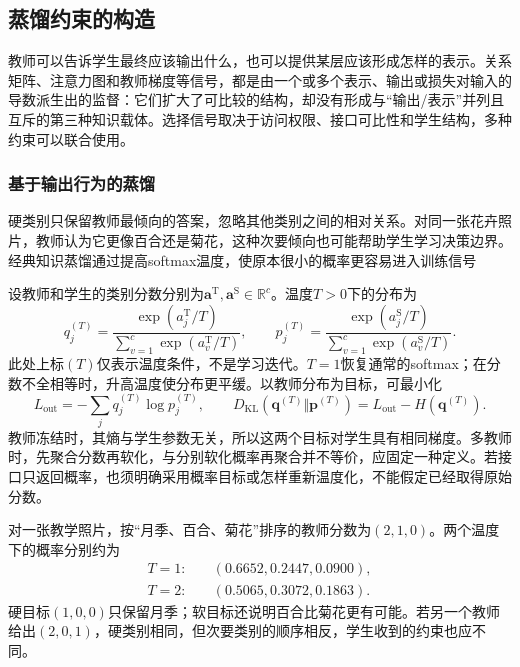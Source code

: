 \subsection{蒸馏约束的构造}
\label{sec:ket-integration-distillation-losses}

教师可以告诉学生最终应该输出什么，也可以提供某层应该形成怎样的表示。关系矩阵、注意力图和教师梯度等信号，都是由一个或多个表示、输出或损失对输入的导数派生出的监督：它们扩大了可比较的结构，却没有形成与“输出/表示”并列且互斥的第三种知识载体。选择信号取决于访问权限、接口可比性和学生结构，多种约束可以联合使用。

\subsubsection{基于输出行为的蒸馏}
\label{sec:ket-integration-output-distillation}

硬类别只保留教师最倾向的答案，忽略其他类别之间的相对关系。对同一张花卉照片，教师认为它更像百合还是菊花，这种次要倾向也可能帮助学生学习决策边界。经典知识蒸馏通过提高softmax温度，使原本很小的概率更容易进入训练信号

设教师和学生的类别分数分别为$\bm{a}^{\mathrm{T}},\bm{a}^{\mathrm{S}}\in\mathbb{R}^{c}$。温度$T>0$下的分布为
\begin{equation}
  q_j^{(T)}=\frac{\exp(a_j^{\mathrm{T}}/T)}
                    {\sum_{v=1}^{c}\exp(a_v^{\mathrm{T}}/T)},\qquad
  p_j^{(T)}=\frac{\exp(a_j^{\mathrm{S}}/T)}
                    {\sum_{v=1}^{c}\exp(a_v^{\mathrm{S}}/T)}.
  \label{eq:ket-integration-temperature}
\end{equation}
此处上标$(T)$仅表示温度条件，不是学习迭代。$T=1$恢复通常的softmax；在分数不全相等时，升高温度使分布更平缓。以教师分布为目标，可最小化
\begin{equation}
  L_{\mathrm{out}}
  =-\sum_j q_j^{(T)}\log p_j^{(T)},\qquad
  D_{\mathrm{KL}}(\bm{q}^{(T)}\Vert\bm{p}^{(T)})
  =L_{\mathrm{out}}-H(\bm{q}^{(T)}).
  \label{eq:ket-integration-output-loss}
\end{equation}
教师冻结时，其熵与学生参数无关，所以这两个目标对学生具有相同梯度。多教师时，先聚合分数再软化，与分别软化概率再聚合并不等价，应固定一种定义。若接口只返回概率，也须明确采用概率目标或怎样重新温度化，不能假定已经取得原始分数。

\begin{example}[三个类别携带的信息]
  \label{ex:ket-integration-soft-labels}
  对一张教学照片，按“月季、百合、菊花”排序的教师分数为$(2,1,0)$。两个温度下的概率分别约为
  \[
    \begin{aligned}
      T=1:\quad &(0.6652,0.2447,0.0900),\\
      T=2:\quad &(0.5065,0.3072,0.1863).
    \end{aligned}
  \]
  硬目标$(1,0,0)$只保留月季；软目标还说明百合比菊花更有可能。若另一个教师给出$(2,0,1)$，硬类别相同，但次要类别的顺序相反，学生收到的约束也应不同。
\end{example}


